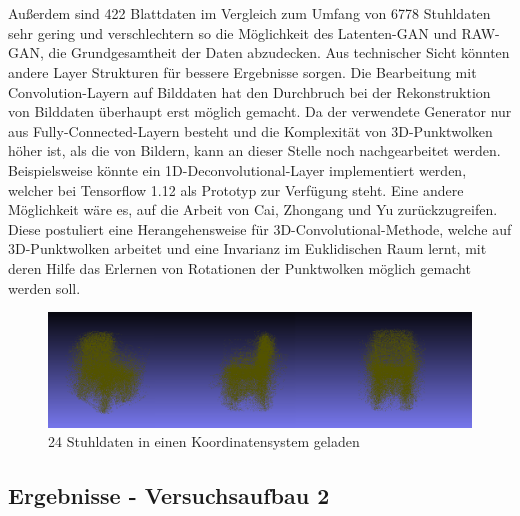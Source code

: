 \documentclass{llncs}
\begin{document}
\\\\ 
Außerdem sind 422 Blattdaten im Vergleich zum Umfang von 6778 Stuhldaten sehr gering und verschlechtern so die Möglichkeit des Latenten-GAN und RAW-GAN, die Grundgesamtheit der Daten abzudecken. Aus technischer Sicht könnten andere Layer Strukturen für bessere Ergebnisse sorgen. Die Bearbeitung mit Convolution-Layern auf Bilddaten hat den  Durchbruch bei der Rekonstruktion von Bilddaten überhaupt erst möglich gemacht\cite{imagerecon}. Da der verwendete Generator nur aus Fully-Connected-Layern besteht und die Komplexität von 3D-Punktwolken höher ist,  als die von Bildern, kann an dieser Stelle noch nachgearbeitet werden. Beispielsweise könnte ein 1D-Deconvolutional-Layer implementiert werden, welcher bei Tensorflow 1.12 als Prototyp zur Verfügung steht. Eine andere Möglichkeit wäre es, auf die Arbeit von Cai, Zhongang  und Yu \cite{3d-conv} zurückzugreifen. Diese postuliert eine Herangehensweise für 3D-Convolutional-Methode, welche auf 3D-Punktwolken arbeitet und eine Invarianz im Euklidischen Raum lernt, mit deren Hilfe das Erlernen von Rotationen der Punktwolken möglich gemacht werden soll.
\begin{figure}[htbp] 
	\centering
	\includegraphics[width=1.0\textwidth]{chair_all.png}
	\caption{24 Stuhldaten in einen Koordinatensystem geladen}
	\label{fig:Bild85}
\end{figure}
\newpage
\subsection{Ergebnisse - Versuchsaufbau 2}
\end{document}
